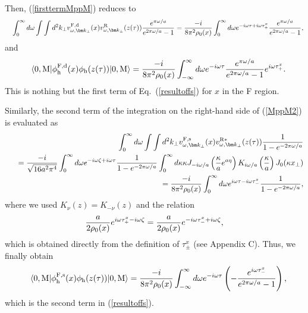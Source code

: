\documentclass[aps,prd,preprintnumbers,nofootinbib,showpacs]{revtex4}%
\begin{document}
\begin{widetext}
Then, (\ref{firsttermMppM}) %
reduces to 
\begin{eqnarray}
&&\int_0^{\infty}d\omega\int\int d^2k_\perp
v_{\omega,\bm k_\perp}^{\rm F,d}(x)v_{\omega,\bm k_\perp}^{\rm R}(z(\tau))
{e^{\pi\omega/a}\over e^{2\pi\omega/a}-1}
={-i\over 8\pi^2\rho_0(x)}\int_0^\infty d\omega e^{-i\omega\tau +i\omega\tau_+^{x}}
{e^{\pi\omega/a}\over e^{2\pi\omega/a}-1},
\label{firsttermMppMA}
\end{eqnarray}
and 
\begin{eqnarray}
&&\langle0,{\rm M}|\phi_{\rm h}^{\rm F,d}(x) \phi_{\rm h}(z(\tau))|0,{\rm M}\rangle
={-i\over 8\pi^2\rho_0(x)}\int_{-\infty}^{\infty} d\omega e^{-i\omega\tau}
{e^{\pi\omega/a}\over e^{2\pi\omega/a}-1}e^{i\omega\tau_+^{x}}.
\end{eqnarray}
This is nothing but the first term of Eq.~(\ref{resultoffs}) for $x$ in the F region. 


Similarly, the second term of the integration on the right-hand side of (\ref{MppM2}) is 
evaluated as 
\begin{eqnarray}
&&\int_0^{\infty}d\omega\int\int d^2k_\perp
v_{\omega,\bm k_\perp}^{\rm F,s}(x)v_{\omega,\bm k_\perp}^{\rm R*}(z(\tau))
{1\over 1-e^{-2\pi\omega/a}}
\nonumber\\
&&~~={-i\over \sqrt{16 a^2\pi^4}}\int_0^{\infty}d\omega e^{-i\omega\zeta+i\omega\tau}
{1\over 1-e^{-2\pi\omega/a}} \int_0^\infty d\kappa \kappa J_{-i\omega/a}\left({\kappa\over a}e^{a\eta}\right)
K_{i\omega/a}\left({\kappa\over a}\right) J_0(\kappa x_\perp)
\nonumber\\
&&~~={-i\over 8\pi^2\rho_0(x)}\int_0^\infty d\omega e^{i\omega\tau -i\omega\tau_-^{x}}
{1\over 1-e^{-2\pi\omega/a}},
\label{firsttermMppMD}
\end{eqnarray}
where we used $K_\nu(z)=K_{-\nu}(z)$ and the relation
\begin{eqnarray}
{a\over 2\rho_0(x)}e^{i\omega\tau_+^{x}-i\omega\zeta}
={a\over 2\rho_0(x)}e^{-i\omega\tau_-^{x}+i\omega\zeta},
\label{arhoarho}
\end{eqnarray}
which is obtained directly from the definition of $\tau_\pm^x$ (see Appendix C).
Thus, we finally obtain
\begin{eqnarray}
&&\langle0,{\rm M}|\phi_{\rm h}^{\rm F,s}(x) \phi_{\rm h}(z(\tau))|0,{\rm M}\rangle
={-i\over 8\pi^2\rho_0(x)}\int_{-\infty}^{\infty} d\omega e^{-i\omega\tau}\left(
-{e^{i\omega\tau_-^{x}}\over e^{2\pi\omega/a}-1}
\right),
\end{eqnarray}
which is the second term in (\ref{resultoffs}). 



\end{widetext}
\end{document}
